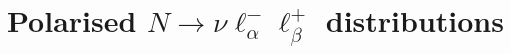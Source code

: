 \section{Polarised $N\to\nu \ell_\alpha^-\ell^+_\beta$ distributions}
\label{app:threebody_dist}

%
%
%
%
%
